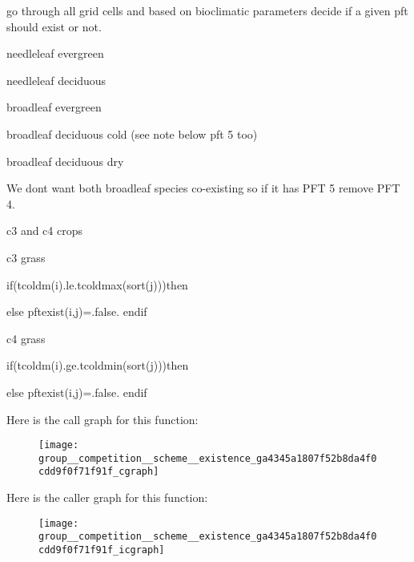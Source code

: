 go through all grid cells and based on bioclimatic parameters decide if a given pft should exist or not.

needleleaf evergreen

needleleaf deciduous

broadleaf evergreen

broadleaf deciduous cold (see note below pft 5 too)

broadleaf deciduous dry

We don\textquotesingle{}t want both broadleaf species co-\/existing so if it has P\+F\+T 5 remove P\+F\+T 4.

c3 and c4 crops

c3 grass

if(tcoldm(i).le.\+tcoldmax(sort(j)))then

else pftexist(i,j)=.false. endif

c4 grass

if(tcoldm(i).ge.\+tcoldmin(sort(j)))then

else pftexist(i,j)=.false. endif 

Here is the call graph for this function\+:\nopagebreak
\begin{figure}[H]
\begin{center}
\leavevmode
\texttt{[image: group\_\_competition\_\_scheme\_\_existence\_ga4345a1807f52b8da4f0cdd9f0f71f91f\_cgraph]}
\end{center}
\end{figure}




Here is the caller graph for this function\+:\nopagebreak
\begin{figure}[H]
\begin{center}
\leavevmode
\texttt{[image: group\_\_competition\_\_scheme\_\_existence\_ga4345a1807f52b8da4f0cdd9f0f71f91f\_icgraph]}
\end{center}
\end{figure}


